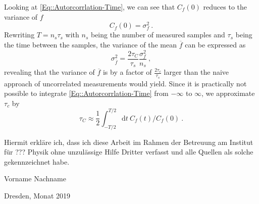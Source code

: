 	Looking at \autoref{Eq::Autorcorrlation-Time}, we can see that $C_f(0)$ reduces to the variance of $f$
	\begin{equation}
		C_f(0) =	\sigma_f^2~.
	\end{equation}
	Rewriting $T =	n_s \tau_s$ with $n_s$ being the number of measured samples and $\tau_s$ being the time between the samples, the variance of the mean $\overline{f}$ can be expressed as
	\begin{equation}
		\sigma_{\overline{f}}^2 =	\frac{2 \tau_C}{\tau_s} \frac{\sigma_f^2}{n_s} ~,
	\end{equation}
	revealing that the variance of $\overline{f}$ is by a factor of $\frac{2 \tau_c}{\tau_s}$ larger than the naive approach of uncorrelated measurements would yield. Since it is practically not possible to integrate \autoref{Eq::Autorcorrlation-Time} from $-\infty$ to $\infty$,   we approximate $\tau_c$ by
	\begin{equation}
		\tau_C \approx \frac{1}{2} \int_{-T/2}^{T/2} \text{d}t~C_f(t) /	C_f(0)~.
	\end{equation}
	
	
	
	\clearpage
	\thispagestyle{empty}
	\vspace*{1.5em}
	
	Hiermit erkläre ich, dass ich diese Arbeit im Rahmen der Betreuung am Institut
	für ??? Physik ohne unzulässige Hilfe Dritter verfasst und alle Quellen als solche gekennzeichnet habe.
	
	\vspace*{45em}
	
	Vorname Nachname \par
	Dresden, Monat 2019
	

